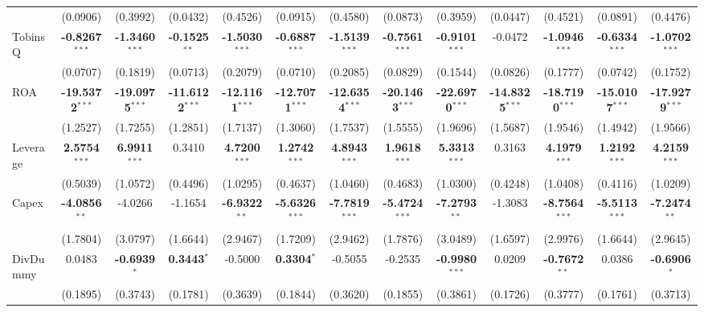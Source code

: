 \begin{landscape}
\begin{table}[H]
\begin{tabular}{lcccccccccccc}
 & (0.0906) & (0.3992) & (0.0432) & (0.4526) & (0.0915) & (0.4580) & (0.0873) & (0.3959) & (0.0447) & (0.4521) & (0.0891) & (0.4476) \\
TobinsQ & \textbf{-0.8267}$^{***}$ & \textbf{-1.3460}$^{***}$ & \textbf{-0.1525}$^{**}$ & \textbf{-1.5030}$^{***}$ & \textbf{-0.6887}$^{***}$ & \textbf{-1.5139}$^{***}$ & \textbf{-0.7561}$^{***}$ & \textbf{-0.9101}$^{***}$ & -0.0472 & \textbf{-1.0946}$^{***}$ & \textbf{-0.6334}$^{***}$ & \textbf{-1.0702}$^{***}$ \\
 & (0.0707) & (0.1819) & (0.0713) & (0.2079) & (0.0710) & (0.2085) & (0.0829) & (0.1544) & (0.0826) & (0.1777) & (0.0742) & (0.1752) \\
ROA & \textbf{-19.5372}$^{***}$ & \textbf{-19.0975}$^{***}$ & \textbf{-11.6122}$^{***}$ & \textbf{-12.1161}$^{***}$ & \textbf{-12.7071}$^{***}$ & \textbf{-12.6354}$^{***}$ & \textbf{-20.1463}$^{***}$ & \textbf{-22.6970}$^{***}$ & \textbf{-14.8325}$^{***}$ & \textbf{-18.7190}$^{***}$ & \textbf{-15.0107}$^{***}$ & \textbf{-17.9279}$^{***}$ \\
 & (1.2527) & (1.7255) & (1.2851) & (1.7137) & (1.3060) & (1.7537) & (1.5555) & (1.9696) & (1.5687) & (1.9546) & (1.4942) & (1.9566) \\
Leverage & \textbf{2.5754}$^{***}$ & \textbf{6.9911}$^{***}$ & 0.3410 & \textbf{4.7200}$^{***}$ & \textbf{1.2742}$^{***}$ & \textbf{4.8943}$^{***}$ & \textbf{1.9618}$^{***}$ & \textbf{5.3313}$^{***}$ & 0.3163 & \textbf{4.1979}$^{***}$ & \textbf{1.2192}$^{***}$ & \textbf{4.2159}$^{***}$ \\
 & (0.5039) & (1.0572) & (0.4496) & (1.0295) & (0.4637) & (1.0460) & (0.4683) & (1.0300) & (0.4248) & (1.0408) & (0.4116) & (1.0209) \\
Capex & \textbf{-4.0856}$^{**}$ & -4.0266 & -1.1654 & \textbf{-6.9322}$^{**}$ & \textbf{-5.6326}$^{***}$ & \textbf{-7.7819}$^{***}$ & \textbf{-5.4724}$^{***}$ & \textbf{-7.2793}$^{**}$ & -1.3083 & \textbf{-8.7564}$^{***}$ & \textbf{-5.5113}$^{***}$ & \textbf{-7.2474}$^{**}$ \\
 & (1.7804) & (3.0797) & (1.6644) & (2.9467) & (1.7209) & (2.9462) & (1.7876) & (3.0489) & (1.6597) & (2.9976) & (1.6644) & (2.9645) \\
DivDummy & 0.0483 & \textbf{-0.6939}$^{*}$ & \textbf{0.3443}$^{*}$ & -0.5000 & \textbf{0.3304}$^{*}$ & -0.5055 & -0.2535 & \textbf{-0.9980}$^{***}$ & 0.0209 & \textbf{-0.7672}$^{**}$ & 0.0386 & \textbf{-0.6906}$^{*}$ \\
 & (0.1895) & (0.3743) & (0.1781) & (0.3639) & (0.1844) & (0.3620) & (0.1855) & (0.3861) & (0.1726) & (0.3777) & (0.1761) & (0.3713) \\

\end{tabular}
\end{table}
\end{landscape}
